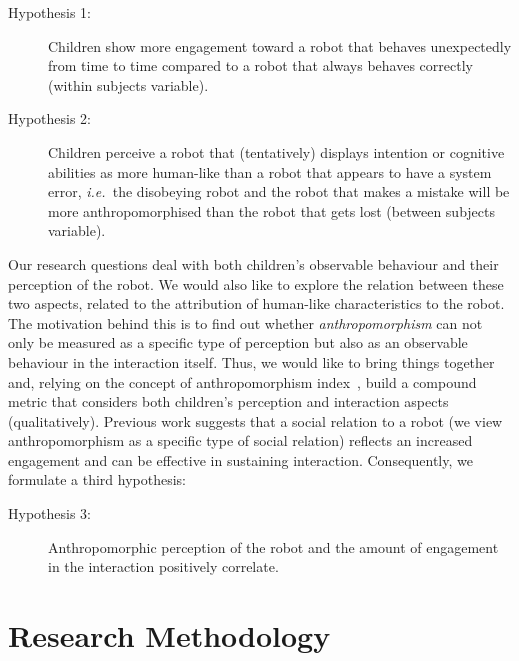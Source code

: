 \documentclass{sig-alternate}
\newcommand{\ie}{{\textit{i.e.~}}}
\begin{document}
\begin{description}

    \item[Hypothesis 1:] Children show more engagement toward a robot that
        behaves unexpectedly from time to time compared to a robot that always
        behaves correctly (within subjects variable).

    \item[Hypothesis 2:] Children perceive a robot that (tentatively) displays
        intention or cognitive abilities as more human-like than a robot that
        appears to have a system error, \ie the disobeying robot and the robot
        that makes a mistake will be more anthropomorphised than the robot that
        gets lost (between subjects variable).

\end{description}

Our research questions deal with both children's observable behaviour and their
perception of the robot. We would also like to explore the relation between
these two aspects, related to the attribution of human-like characteristics to
the robot. The motivation behind this is to find out whether
\textit{anthropomorphism} can not only be measured as a specific type of
perception but also as an observable behaviour in the interaction itself. Thus,
we would like to bring things together and, relying on the concept of
anthropomorphism index~\cite{fink2014dynamics}, build a compound metric that
considers both children's perception and interaction aspects (qualitatively).
Previous work suggests that a social relation to a robot (we view
anthropomorphism as a specific type of social relation) reflects an increased
engagement and can be effective in sustaining interaction.  Consequently, we
formulate a third hypothesis:

\begin{description}

    \item[Hypothesis 3:] Anthropomorphic perception of the robot and the amount
    of engagement in the interaction positively correlate.

\end{description}



\section{Research Methodology}
\end{document}
